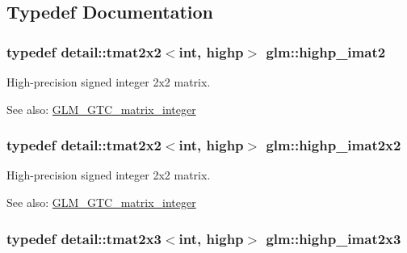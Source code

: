 \subsection{Typedef Documentation}
\hypertarget{group__gtc__matrix__integer_g70eae282157f23589db24f4664bbf956}{
\subsubsection[highp\_\-imat2]{\setlength{\rightskip}{0pt plus 5cm}typedef detail::tmat2x2$<$int, highp$>$ {\bf glm::highp\_\-imat2}}}
\label{group__gtc__matrix__integer_g70eae282157f23589db24f4664bbf956}


High-precision signed integer 2x2 matrix. \begin{Desc}
\item[See also:]\hyperlink{group__gtc__matrix__integer}{GLM\_\-GTC\_\-matrix\_\-integer} \end{Desc}
\hypertarget{group__gtc__matrix__integer_g9646ff5ef973234755e63e727c5a37fc}{
\subsubsection[highp\_\-imat2x2]{\setlength{\rightskip}{0pt plus 5cm}typedef detail::tmat2x2$<$int, highp$>$ {\bf glm::highp\_\-imat2x2}}}
\label{group__gtc__matrix__integer_g9646ff5ef973234755e63e727c5a37fc}


High-precision signed integer 2x2 matrix. \begin{Desc}
\item[See also:]\hyperlink{group__gtc__matrix__integer}{GLM\_\-GTC\_\-matrix\_\-integer} \end{Desc}
\hypertarget{group__gtc__matrix__integer_g7b7079ab95ac8f533ac565fcf1341c76}{
\subsubsection[highp\_\-imat2x3]{\setlength{\rightskip}{0pt plus 5cm}typedef detail::tmat2x3$<$int, highp$>$ {\bf glm::highp\_\-imat2x3}}}
\label{group__gtc__matrix__integer_g7b7079ab95ac8f533ac565fcf1341c76}


